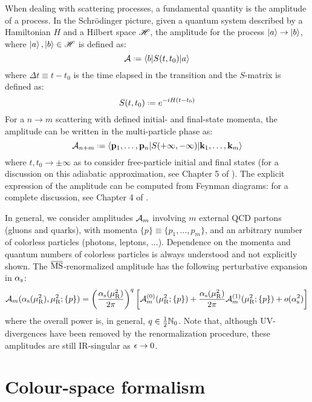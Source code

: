 When dealing with scattering processes, a fundamental quantity is the amplitude of a process. In the Schrödinger picture, given a quantum system described by a Hamiltonian $ H $ and a Hilbert space $ \mathscr{H} $, the amplitude for the process $ \ket{a} \rightarrow \ket{b} $, where $ \ket{a} , \ket{b} \in \mathscr{H} $ is defined as:
\begin{equation}
  \ampl \defeq \braket{b | \smat(t , t_0) | a}
\end{equation}
where $ \Delta t \equiv t - t_0 $ is the time elapsed in the transition and the $ S $-matrix is defined as:
\begin{equation}
  \smat(t , t_0) \defeq e^{- i H (t - t_0)}
\end{equation}
For a $ n \rightarrow m $ scattering with defined initial- and final-state momenta, the amplitude can be written in the multi-particle phase as:
\begin{equation}
  \ampl_{n + m} \defeq \braket{\ve{p}_1, \dots, \ve{p}_n | \smat(+\infty , -\infty) | \ve{k}_1, \dots, \ve{k}_m} 
\end{equation}
where $ t, t_0 \rightarrow \pm \infty $ as to consider free-particle initial and final states (for a discussion on this adiabatic approximation, see Chapter 5 of \cite{Itzykson-1980}). The explicit expression of the amplitude can be computed from Feynman diagrams: for a complete discussion, see Chapter 4 of \cite{Peskin-1995}.

In general, we consider amplitudes $ \mathcal{A}_m $ involving $ m $ external QCD partons (gluons and quarks), with momenta $ \{p\} \equiv \{p_1, \dots, p_m\} $, and an arbitrary number of colorless particles (photons, leptons, ...). Dependence on the momenta and quantum numbers of colorless particles is always understood and not explicitly shown. The $ \overline{\text{MS}} $-renormalized amplitude has the following perturbative expansion in $ \alpha_\text{s} $:
\begin{equation}
  \mathcal{A}_m(\alpha_\text{s}(\mu_\text{R}^2), \mu_\text{R}^2 ; \{p\}) = \left( \frac{\alpha_\text{s}(\mu_\text{R}^2)}{2\pi} \right)^q \left[ \mathcal{A}_m^{(0)}(\mu_\text{R}^2 ; \{p\}) + \frac{\alpha_\text{s}(\mu_\text{R}^2)}{2\pi} \mathcal{A}_m^{(1)}(\mu_\text{R}^2 ; \{p\}) + o(\alpha_\text{s}^2) \right]
  \label{eq:mat-exp}
\end{equation}
where the overall power is, in general, $ q \in \frac{1}{2} \mathbb{N}_0 $. Note that, although UV-divergences have been removed by the renormalization procedure, these amplitudes are still IR-singular as $ \epsilon \rightarrow 0 $.

\section{Colour-space formalism}
\label{sec:colour-space}

